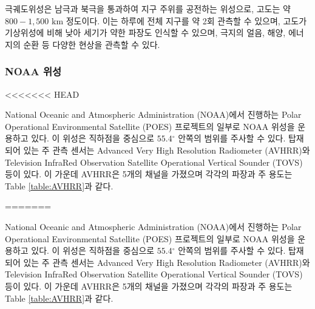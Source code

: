극궤도위성은 남극과 북극을 통과하여 지구 주위를 공전하는 위성으로, 고도는 약 $800 - 1,500 \textrm{ km}$ 정도이다. 이는 하루에 전체 지구를 약 2회 관측할 수 있으며, 고도가 기상위성에 비해 낮아 세기가 약한 파장도 인식할 수 있으며, 극지의 얼음, 해양, 에너지의 순환 등 다양한 현상을 관측할 수 있다.


\subsubsection{NOAA 위성}
<<<<<<< HEAD

National Oceanic and Atmospheric Administration (NOAA)에서 진행하는 Polar Operational Environmental Satellite (POES) 프로젝트의 일부로 NOAA 위성을 운용하고 있다. 이 위성은 직하점을 중심으로 $55.4 {^\circ}$ 안쪽의 범위를 주사할 수 있다. 탑재되어 있는 주 관측 센서는 Advanced Very High Resolution Radiometer (AVHRR)와 Television InfraRed Observation Satellite Operational Vertical Sounder (TOVS) 등이 있다. 이 가운데 AVHRR은 5개의 채널을 가졌으며 각각의 파장과 주 용도는 Table \ref{table:AVHRR}과 같다.

=======

National Oceanic and Atmospheric Administration (NOAA)에서 진행하는 Polar Operational Environmental Satellite (POES) 프로젝트의 일부로 NOAA 위성을 운용하고 있다. 이 위성은 직하점을 중심으로 $55.4 {^\circ}$ 안쪽의 범위를 주사할 수 있다. 탑재되어 있는 주 관측 센서는 Advanced Very High Resolution Radiometer (AVHRR)와 Television InfraRed Observation Satellite Operational Vertical Sounder (TOVS) 등이 있다. 이 가운데 AVHRR은 5개의 채널을 가졌으며 각각의 파장과 주 용도는 Table \ref{table:AVHRR}과 같다.

